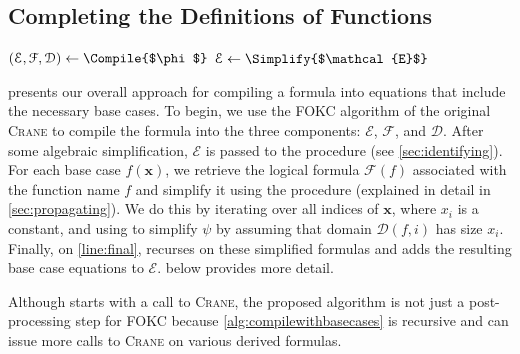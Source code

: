 \documentclass[a4paper,UKenglish,cleveref, autoref, thm-restate]{lipics-v2021}
\begin{document}

\subsection{Completing the Definitions of Functions}\label{sec:completing}

\begin{algorithm}[t]
  \caption{\protect\CompileWithBaseCases{$\phi$}}\label{alg:compilewithbasecases}
  $(\mathcal{E}, \mathcal{F}, \mathcal{D}) \gets \Compile{$\phi$}$\;
  $\mathcal{E} \gets \Simplify{$\mathcal{E}$}$\;\label{line:second}
\end{algorithm}


 presents our overall approach for compiling a
formula into equations that include the necessary base cases. To begin, we use
the FOKC algorithm of the original \textsc{Crane} to compile the formula into
the three components: $\mathcal{E}$, $\mathcal{F}$, and $\mathcal{D}$. After
some algebraic simplification, $\mathcal{E}$ is passed to the \FindBaseCases
procedure (see \cref{sec:identifying}). For each base case $f(\mathbf{x})$, we
retrieve the logical formula $\mathcal{F}(f)$ associated with the function name
$f$ and simplify it using the \Propagate procedure (explained in detail in
\cref{sec:propagating}). We do this by iterating over all indices of
$\mathbf{x}$, where $x_{i}$ is a constant, and using \Propagate to simplify
$\psi$ by assuming that domain $\mathcal{D}(f, i)$ has size $x_{i}$. Finally, on
\autoref{line:final}, \CompileWithBaseCases recurses on these simplified
formulas and adds the resulting base case equations to $\mathcal{E}$.
 below provides more detail.

\begin{remark*}
  Although \CompileWithBaseCases starts with a call to \textsc{Crane}, the
  proposed algorithm is not just a post-processing step for FOKC because
  \cref{alg:compilewithbasecases} is recursive and can issue more calls to
  \textsc{Crane} on various derived formulas.
\end{remark*}
\end{document}
